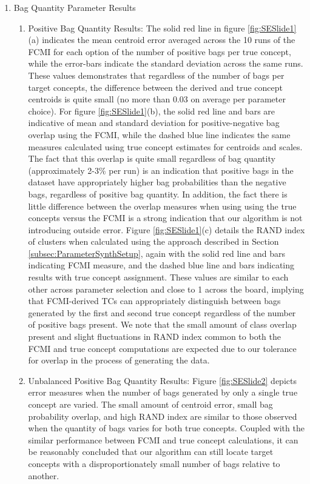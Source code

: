 \documentclass[12pt,dvips]{report}
\numberwithin{equation}{section}
\begin{document}
\begin{enumerate}



\item Bag Quantity Parameter Results

	\begin{enumerate}

	\item Positive Bag Quantity Results: The solid red line in figure \ref{fig:SESlide1}(a) indicates the mean centroid error averaged across the 10 runs of the FCMI for each option of the number of positive bags per true concept, while the error-bars indicate the standard deviation across the same runs.  These values demonstrates that regardless of the number of bags per target concepts, the difference between the derived and true concept centroids is quite small (no more than 0.03 on average per parameter choice).    For figure \ref{fig:SESlide1}(b), the solid red line and bars are indicative of mean and standard deviation for positive-negative bag overlap using the FCMI, while the dashed blue line indicates the same measures calculated using true concept estimates for centroids and scales. The fact that this overlap is quite small regardless of bag quantity (approximately 2-3\% per run) is an indication that positive bags in the dataset have appropriately higher bag probabilities than the negative bags, regardless of positive bag quantity.  In addition, the fact there is little difference between the overlap measures when using using the true concepts versus the FCMI is a strong indication that our algorithm is not introducing outside error. Figure \ref{fig:SESlide1}(c) details the RAND index of clusters when calculated using the approach described in Section \ref{subsec:ParameterSynthSetup}, again with the solid red line and bars indicating FCMI measure, and the dashed blue line and bars indicating results with true concept assignment.  These values are similar to each other across parameter selection and close to 1 across the board, implying that FCMI-derived TCs can appropriately distinguish between bags generated by the first and second true concept regardless of the number of positive bags present.
We note that the small amount of class overlap present and slight fluctuations in RAND index common to both the FCMI and true concept computations are expected due to our tolerance for overlap in the process of generating the data.
	\item Unbalanced Positive Bag Quantity Results:  Figure \ref{fig:SESlide2} depicts error measures when the number of bags generated by only a single true concept are varied. The small amount of centroid error, small bag probability overlap, and high RAND index are similar to those observed when the quantity of bags varies for both true concepts.  Coupled with the similar performance between FCMI and true concept calculations, it can be reasonably concluded that our algorithm can still locate target concepts with a disproportionately small number of bags relative to another.

\end{enumerate}
\end{enumerate}
\end{document}
